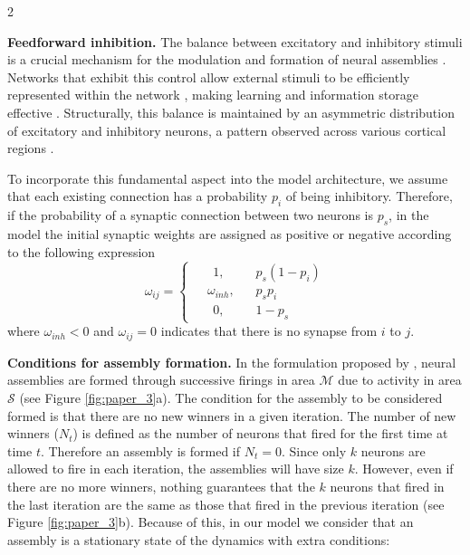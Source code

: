 \documentclass[a4paper, 10pt]{article}
\begin{document}
\begin{multicols}{2}

\noindent\textbf{Feedforward inhibition.} The balance between excitatory and inhibitory stimuli is a crucial mechanism for the modulation and formation of neural assemblies \cite{sadra}. Networks that exhibit this control allow external stimuli to be efficiently represented within the network \cite{Zhou2018}, making learning and information storage effective \cite{Sukenik2021}. Structurally, this balance is maintained by an asymmetric distribution of excitatory and inhibitory neurons, a pattern observed across various cortical regions \cite{Alreja2022}.

To incorporate this fundamental aspect into the model architecture, we assume that each existing connection has a probability $p_i$ of being inhibitory. Therefore, if the probability of a synaptic connection between two neurons is $p_s$, in the model the initial synaptic weights are assigned as positive or negative according to the following expression
\begin{equation}\label{eq:weights}
 \omega_{ij} =\begin{cases}
       \;\;\quad1\text{,} &\quad\text{$p_s(1-p_i)$}\\
\;\;\;\;\omega_{inh}\text{,} &\quad\text{$p_sp_i$}\\\;\;\quad0\text{,} & \quad\text{$1-p_s$}
     \end{cases}
\end{equation}
where $\omega_{inh} <0$ and $\omega_{ij} = 0$ indicates that there is no synapse from $i$ to $j$. 
\newline

\noindent\textbf{Conditions for assembly formation.} In the formulation proposed by \cite{christos}, neural assemblies are formed through successive firings in area $\mathcal{M}$ due to  activity in area $\mathcal{S}$ (see Figure \ref{fig:paper_3}a). The condition for the assembly to be considered formed is that there are no new winners in a given iteration. The number of new winners ($N_t$) is defined as the number of neurons that fired for the first time at time $t$. Therefore an assembly is formed if $N_t = 0$. Since only $k$ neurons are allowed to fire in each iteration, the assemblies will have size $k$. However, even if there are no more winners, nothing guarantees that the $k$ neurons that fired in the last iteration are the same as those that fired in the previous iteration (see Figure \ref{fig:paper_3}b). Because of this, in our model we consider that an assembly is a stationary state of the dynamics with extra conditions: 


\end{multicols}
\end{document}
